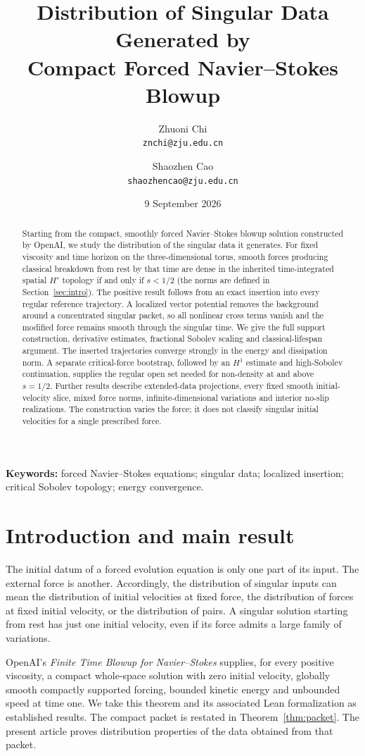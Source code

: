 \documentclass[11pt,a4paper]{article}
\title{Distribution of Singular Data Generated by\\ Compact Forced Navier--Stokes Blowup}
\author{Zhuoni Chi\\\texttt{znchi@zju.edu.cn}\and Shaozhen Cao\\\texttt{shaozhencao@zju.edu.cn}}
\date{9 September 2026}
\theoremstyle{definition}\newtheorem{definition}[theorem]{Definition}
\theoremstyle{remark}\newtheorem{remark}[theorem]{Remark}
\begin{document}
\maketitle
\begin{abstract}
Starting from the compact, smoothly forced Navier--Stokes blowup solution constructed by OpenAI, we study the distribution of the singular data it generates. For fixed viscosity and time horizon on the three-dimensional torus, smooth forces producing classical breakdown from rest by that time are dense in the inherited time-integrated spatial $H^s$ topology if and only if $s<1/2$ (the norms are defined in Section~\ref{sec:intro}). The positive result follows from an exact insertion into every regular reference trajectory. A localized vector potential removes the background around a concentrated singular packet, so all nonlinear cross terms vanish and the modified force remains smooth through the singular time. We give the full support construction, derivative estimates, fractional Sobolev scaling and classical-lifespan argument. The inserted trajectories converge strongly in the energy and dissipation norm. A separate critical-force bootstrap, followed by an $H^1$ estimate and high-Sobolev continuation, supplies the regular open set needed for non-density at and above $s=1/2$. Further results describe extended-data projections, every fixed smooth initial-velocity slice, mixed force norms, infinite-dimensional variations and interior no-slip realizations. The construction varies the force; it does not classify singular initial velocities for a single prescribed force.
\end{abstract}
\noindent\textbf{Keywords:} forced Navier--Stokes equations; singular data; localized insertion; critical Sobolev topology; energy convergence.

\section{Introduction and main result}\label{sec:intro}
The initial datum of a forced evolution equation is only one part of its input. The external force is another. Accordingly, the distribution of singular inputs can mean the distribution of initial velocities at fixed force, the distribution of forces at fixed initial velocity, or the distribution of pairs. A singular solution starting from rest has just one initial velocity, even if its force admits a large family of variations.

OpenAI's \emph{Finite Time Blowup for Navier--Stokes} \cite[Theorem 1.1]{openai} supplies, for every positive viscosity, a compact whole-space solution with zero initial velocity, globally smooth compactly supported forcing, bounded kinetic energy and unbounded speed at time one. We take this theorem and its associated Lean formalization as established results. The compact packet is restated in Theorem~\ref{thm:packet}. The present article proves distribution properties of the data obtained from that packet.
\end{document}
